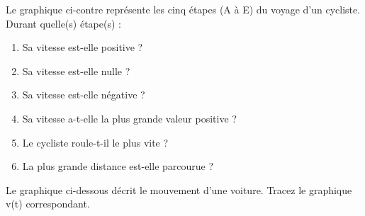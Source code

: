 \begin{exercise}
    Le graphique ci-contre représente les cinq étapes (A à E) du voyage d'un cycliste. Durant quelle(s) étape(s) :
    \begin{enumerate}[label=\alph*)]
        \item Sa vitesse est-elle positive ?
        \item Sa vitesse est-elle nulle ?
        \item Sa vitesse est-elle négative ?
        \item Sa vitesse a-t-elle la plus grande valeur positive ?
        \item Le cycliste roule-t-il le plus vite ?
        \item La plus grande distance est-elle parcourue ?
    \end{enumerate}

\end{exercise}
\begin{solution}
\end{solution}

\begin{exercise}
    Le graphique ci-dessous décrit le mouvement d'une voiture. Tracez le graphique v(t) correspondant.

\end{exercise}


